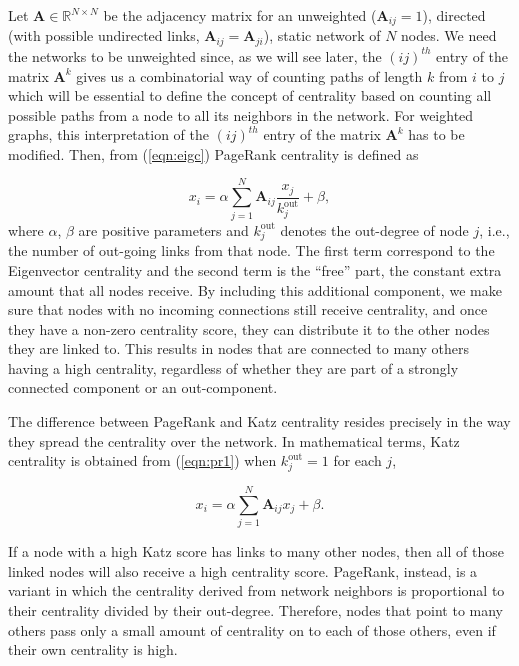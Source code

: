 Let $\mathbf{A}\in\mathbb{R}^{N\times N}$ be the adjacency matrix for an unweighted ($\mathbf{A}_{ij}=1$), directed (with possible undirected links, $\mathbf{A}_{ij} = \mathbf{A}_{ji}$), static network of $N$ nodes. We need the networks to be unweighted since, as we will see later, the $(ij)^{th}$ entry of the matrix $\mathbf{A}^k$ gives us a combinatorial way of counting paths of length $k$ from $i$ to $j$ which will be essential to define the concept of centrality based on counting all possible paths from a node to all its neighbors in the network. For weighted graphs, this interpretation of the $(ij)^{th}$ entry of the matrix $\mathbf{A}^k$ has to be modified. Then, from (\ref{eqn:eigc}) PageRank centrality is defined as

\begin{equation}
\label{eqn:pr1}
    x_i= \alpha\sum_{j=1}^{N}\mathbf{A}_{ij}\frac{x_j}{k_j^{\text{out}}} + \beta,
\end{equation}
where $\alpha$, $\beta$ are positive parameters and $k_j^{\text{out}}$ denotes the out-degree of node $j$, i.e., the number of out-going links from that node. The first term correspond to the Eigenvector centrality and the second term is the “free” part, the constant extra amount that all nodes receive. By including this additional component, we make sure that nodes with no incoming connections still receive centrality, and once they have a non-zero centrality score, they can distribute it to the other nodes they are linked to. This results in nodes that are connected to many others having a high centrality, regardless of whether they are part of a strongly connected component or an out-component.

The difference between PageRank and Katz centrality resides precisely in the way they spread the centrality over the network. In mathematical terms, Katz centrality is obtained from (\ref{eqn:pr1}) when $k_j^{\text{out}}=1$ for each $j$,

\begin{equation}
\label{eqn:katz1}
    x_i= \alpha\sum_{j=1}^{N}\mathbf{A}_{ij}x_j + \beta.
\end{equation}

If a node with a high Katz score has links to many other nodes, then all of those linked nodes will also receive a high centrality score. PageRank, instead, is a variant in which the centrality derived from network neighbors is proportional to their centrality divided by their out-degree. Therefore, nodes that point to many others pass only a small amount of centrality on to each of those others, even if their own centrality is high.

